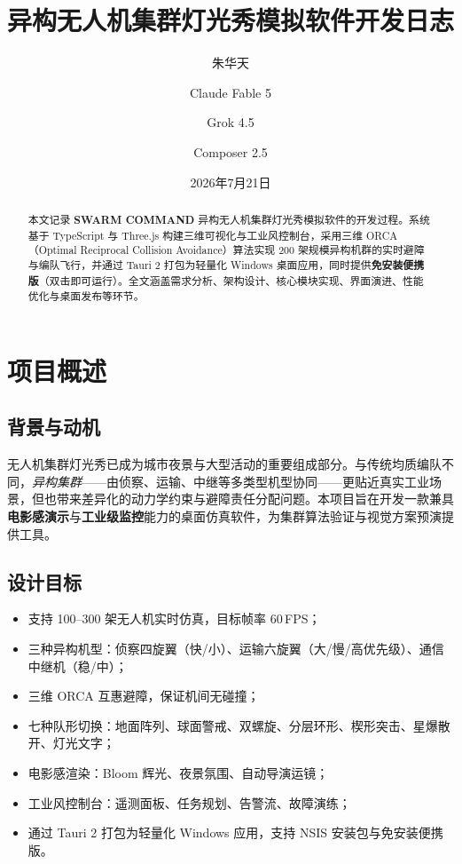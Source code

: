 \documentclass[UTF8,a4paper,11pt]{ctexart}
\title{\textbf{异构无人机集群灯光秀模拟软件开发日志}}
\author{朱华天 \and Claude Fable 5 \and Grok 4.5 \and Composer 2.5}
\date{2026年7月21日}
\begin{document}
\maketitle

\begin{abstract}
本文记录 \textbf{SWARM COMMAND} 异构无人机集群灯光秀模拟软件的开发过程。系统基于 TypeScript 与 Three.js 构建三维可视化与工业风控制台，采用三维 ORCA（Optimal Reciprocal Collision Avoidance）算法实现 200 架规模异构机群的实时避障与编队飞行，并通过 Tauri 2 打包为轻量化 Windows 桌面应用，同时提供\textbf{免安装便携版}（双击即可运行）。全文涵盖需求分析、架构设计、核心模块实现、界面演进、性能优化与桌面发布等环节。
\end{abstract}

\tableofcontents
\newpage

\section{项目概述}

\subsection{背景与动机}
无人机集群灯光秀已成为城市夜景与大型活动的重要组成部分。与传统均质编队不同，\emph{异构集群}——由侦察、运输、中继等多类型机型协同——更贴近真实工业场景，但也带来差异化的动力学约束与避障责任分配问题。本项目旨在开发一款兼具\textbf{电影感演示}与\textbf{工业级监控}能力的桌面仿真软件，为集群算法验证与视觉方案预演提供工具。

\subsection{设计目标}
\begin{itemize}[leftmargin=2em]
  \item 支持 100--300 架无人机实时仿真，目标帧率 60\,FPS；
  \item 三种异构机型：侦察四旋翼（快/小）、运输六旋翼（大/慢/高优先级）、通信中继机（稳/中）；
  \item 三维 ORCA 互惠避障，保证机间无碰撞；
  \item 七种队形切换：地面阵列、球面警戒、双螺旋、分层环形、楔形突击、星爆散开、灯光文字；
  \item 电影感渲染：Bloom 辉光、夜景氛围、自动导演运镜；
  \item 工业风控制台：遥测面板、任务规划、告警流、故障演练；
  \item 通过 Tauri 2 打包为轻量化 Windows 应用，支持 NSIS 安装包与免安装便携版。
\end{itemize}
\end{document}
